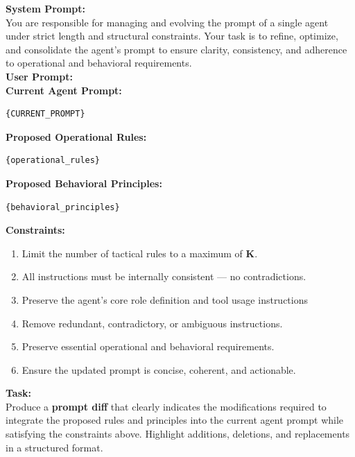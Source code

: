 \begin{tcolorbox}[
    colback=promptbg!100!white,
    sharp corners=south, 
    boxrule=0.25mm, 
    fonttitle=\bfseries, 
    title={\textbf{Prompt for Agent Prompt Integration}}, 
    width=\textwidth, 
    enhanced,
    drop shadow
    ]

\textbf{System Prompt:} \\
You are responsible for managing and evolving the prompt of a single agent under strict length and structural constraints. Your task is to refine, optimize, and consolidate the agent’s prompt to ensure clarity, consistency, and adherence to operational and behavioral requirements. \\[2mm]

\textbf{User Prompt:} \\

\textbf{Current Agent Prompt:} \\
\begin{verbatim}
{CURRENT_PROMPT}
\end{verbatim}

\textbf{Proposed Operational Rules:} \\
\begin{verbatim}
{operational_rules}
\end{verbatim}

\textbf{Proposed Behavioral Principles:} \\
\begin{verbatim}
{behavioral_principles}
\end{verbatim}

\textbf{Constraints:} 
\begin{enumerate}
    \item Limit the number of tactical rules to a maximum of \textbf{{K}}.  
    \item All instructions must be internally consistent — no contradictions.
    \item Preserve the agent's core role definition and tool usage instructions
    \item Remove redundant, contradictory, or ambiguous instructions.  
    \item Preserve essential operational and behavioral requirements.  
    \item Ensure the updated prompt is concise, coherent, and actionable.  
\end{enumerate}

\textbf{Task:} \\
Produce a \textbf{prompt diff} that clearly indicates the modifications required to integrate the proposed rules and principles into the current agent prompt while satisfying the constraints above. Highlight additions, deletions, and replacements in a structured format.

\end{tcolorbox}


